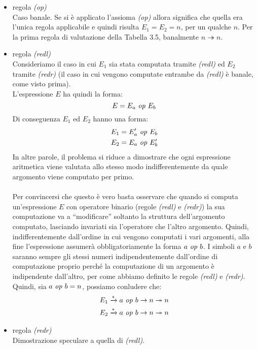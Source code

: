     \begin{itemize}
        \item regola \textit{(op)}\\
            Caso banale. Se si è applicato l'assioma \textit{(op)} allora significa che quella era l'unica regola applicabile e quindi risulta $E_1=E_2=n$, per un qualche $n$. Per la prima regola di valutazione della Tabella 3.5, banalmente $n \twoheadrightarrow n$.
        \item regola \textit{(redl)}\\
            Consideriamo il caso in cui $E_1$ sia stata computata tramite \textit{(redl)} ed $E_2$ tramite \textit{(redr)} (il caso in cui vengono computate entrambe da \textit{(redl)} è banale, come visto prima).\\
            L'espressione $E$ ha quindi la forma:
            $$E=E_a \mbox{ \textit{op} } E_b$$
            Di conseguenza $E_1$ ed $E_2$ hanno una forma:
            \begin{align*}
                E_1 &= E_a' \mbox{ \textit{op} } E_b\\
                E_2 &= E_a \mbox{ \textit{op} } E_b'
            \end{align*}
            In altre parole, il problema si riduce a dimostrare che ogni espressione aritmetica viene valutata allo stesso modo indifferentemente da quale argomento viene computato per primo.\\
            \\
            Per convincersi che questo è vero basta osservare che quando si computa un'espressione $E$ con operatore binario (regole \textit{(redl)} e \textit{(redr)}) la sua computazione va a ``modificare'' soltanto la struttura dell'argomento computato, lasciando invariati sia l'operatore che l'altro argomento. Quindi, indifferentemente dall'ordine in cui vengono computati i vari argomenti, alla fine l'espressione assumerà obbligatoriamente la forma $a \mbox{ \textit{op} } b$. I simboli $a$ e $b$ saranno sempre gli stessi numeri indipendentemente dall'ordine di computazione proprio perché la computazione di un argomento è indipendente dall'altro, per come abbiamo definito le regole \textit{(redl)} e \textit{(redr)}. Quindi, sia $a \mbox{ \textit{op} } b = n$, possiamo conludere che:
            \begin{align*}
                E_1 &\xrightarrow{*} a \mbox{ \textit{op} } b \rightarrow n \twoheadrightarrow n\\
                E_2 &\xrightarrow{*} a \mbox{ \textit{op} } b \rightarrow n \twoheadrightarrow n
            \end{align*}
        \item regola \textit{(redr)}\\
            Dimostrazione speculare a quella di \textit{(redl)}.
    \end{itemize}
